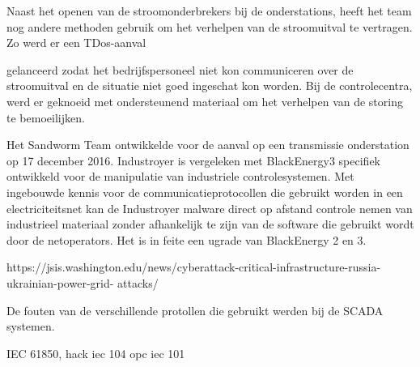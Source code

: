 {Naast het openen van de stroomonderbrekers bij de onderstations, heeft het team nog andere
methoden gebruik om het verhelpen van de stroomuitval te vertragen. Zo werd er een TDos-aanval

gelanceerd zodat het bedrijfspersoneel niet kon communiceren over de stroomuitval en de situatie
niet goed ingeschat kon worden. Bij de controlecentra, werd er geknoeid met ondersteunend
materiaal om het verhelpen van de storing te bemoeilijken.

Het Sandworm Team ontwikkelde voor de aanval op een transmissie onderstation op 17 december
2016. Industroyer is vergeleken met BlackEnergy3 specifiek ontwikkeld voor de manipulatie van
industriele controlesystemen. Met ingebouwde kennis voor de communicatieprotocollen die
gebruikt worden in een electriciteitsnet kan de Industroyer malware direct op afstand controle
nemen van industrieel materiaal zonder afhankelijk te zijn van de software die gebruikt wordt door
de netoperators. Het is in feite een ugrade van BlackEnergy 2 en 3.

https://jsis.washington.edu/news/cyberattack-critical-infrastructure-russia-ukrainian-power-grid-
attacks/

De fouten van de verschillende protollen die gebruikt werden bij de SCADA
systemen.


IEC 61850, hack
iec 104
opc
iec 101


}
